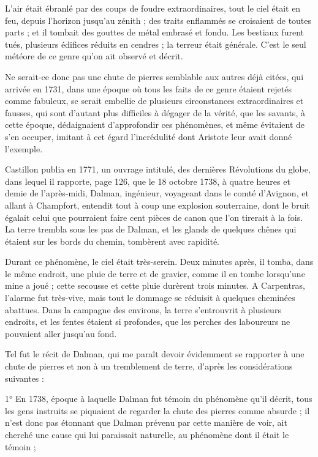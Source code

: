 \documentclass[a4paper, 12pt, oneside, french]{article}
\begin{document}
L'air était ébranlé par des coups de foudre extraordinaires, tout le ciel était en feu, depuis l'horizon jusqu'au zénith ; des traits enflammés se croisaient de toutes parts ; et il tombait des gouttes de métal embrasé et fondu. Les bestiaux furent tués, plusieurs édifices réduits en cendres ; la terreur était générale. C'est le seul météore de ce genre qu'on ait observé et décrit.

Ne serait-ce donc pas une chute de pierres semblable aux autres déjà citées, qui arrivée en 1731, dans une époque où tous les faits de ce genre étaient rejetés comme fabuleux, se serait embellie de plusieurs circonstances extraordinaires et fausses, qui sont d'autant plus difficiles à dégager de la vérité, que les savants, à cette époque, dédaignaient d'approfondir ces phénomènes, et même évitaient de s'en occuper, imitant à cet égard l'incrédulité dont Aristote leur avait donné l'exemple.

Castillon publia en 1771, un ouvrage intitulé, des dernières Révolutions du globe, dans lequel il rapporte, page 126, que le 18 octobre 1738, à quatre heures et demie de l'après-midi, Dalman, ingénieur, voyageant dans le comté d'Avignon, et allant à Champfort, entendit tout à coup une explosion souterraine, dont le bruit égalait celui que pourraient faire cent pièces de canon que l'on tirerait à la fois. La terre trembla sous les pas de Dalman, et les glands de quelques chênes qui étaient sur les bords du chemin, tombèrent avec rapidité.

Durant ce phénomène, le ciel était très-serein. Deux minutes après, il tomba, dans le même endroit, une pluie de terre et de gravier, comme il en tombe lorsqu'une mine a joué ; cette secousse et cette pluie durèrent trois minutes. A Carpentras, l'alarme fut très-vive, mais tout le dommage se réduisit à quelques cheminées abattues. Dans la campagne des environs, la terre s'entrouvrit à plusieurs endroits, et les fentes étaient si profondes, que les perches des laboureurs ne pouvaient aller jusqu'au fond.

Tel fut le récit de Dalman, qui me paraît devoir évidemment se rapporter à une chute de pierres et non à un tremblement de terre, d'après les considérations suivantes :

1° En 1738, époque à laquelle Dalman fut témoin du phénomène qu'il décrit, tous les gens instruits se piquaient de regarder la chute des pierres comme absurde ; il n'est donc pas étonnant que Dalman prévenu par cette manière de voir, ait cherché une cause qui lui paraissait naturelle, au phénomène dont il était le témoin ;
\end{document}
